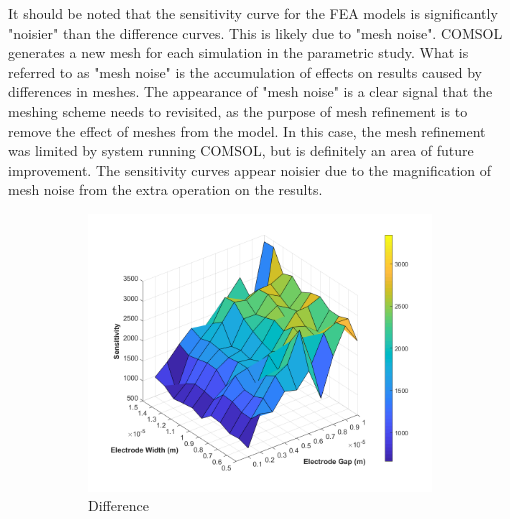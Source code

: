 \par It should be noted that the sensitivity curve for the FEA models is significantly "noisier" than the difference curves. This is likely due to "mesh noise". COMSOL generates a new mesh for each simulation in the parametric study. What is referred to as "mesh noise" is the accumulation of effects on results caused by differences in meshes. The appearance of "mesh noise" is a clear signal that the meshing scheme needs to revisited, as the purpose of mesh refinement is to remove the effect of meshes from the model. In this case, the mesh refinement was limited by system running COMSOL, but is definitely an area of future improvement. The sensitivity curves appear noisier due to the magnification of mesh noise from the extra operation on the results.

\begin{figure}[h]
    \centering
    \begin{subfigure}[b]{0.49\textwidth}
        \centering
        \includegraphics[width=\textwidth]{images/comsol_device_surface_difference.png}
        \caption{Difference}
    \end{subfigure}
    \hfill
    \begin{subfigure}[b]{0.49\textwidth}
        \centering

\end{subfigure}
\end{figure}

